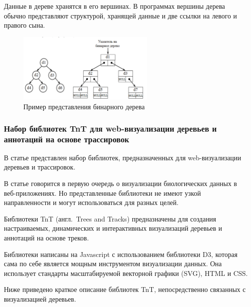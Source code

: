 Данные в дереве хранятся в его вершинах. В программах вершины дерева обычно представляют структурой, хранящей данные и две ссылки на левого и правого сына. 

\begin{figure}[!ht]
	\centering
	\includegraphics[width=0.6\textwidth]{ResearchNotes/rndhpc_not_dbg_2021_11_22/bin_tree.png}
	\caption{Пример представления бинарного дерева} 
\end{figure}

\subsubsection{Набор библиотек TnT для web-визуализации деревьев и аннотаций на основе трассировок}

В статье \cite{Pignatelli2016} представлен набор библиотек, предназначенных для web-визуализации деревьев и трассировок.

В статье говорится в первую очередь о визуализации биологических данных в веб-приложениях. Но представленные библиотеки не имеют узкой направленности и могут использоваться для разных целей.

Библиотеки TnT (англ.~Trees and Tracks) предназначены для создания настраиваемых, динамических и интерактивных визуализаций деревьев и аннотаций на основе треков. 

Библиотеки написаны на Javascript с использованием библиотеки D3, которая сама по себе является мощным инструментом визуализации данных. Она использует стандарты масштабируемой векторной графики (SVG), HTML и CSS.

Ниже приведено краткое описание библиотек TnT, непосредственно связанных с визуализацией деревьев.

